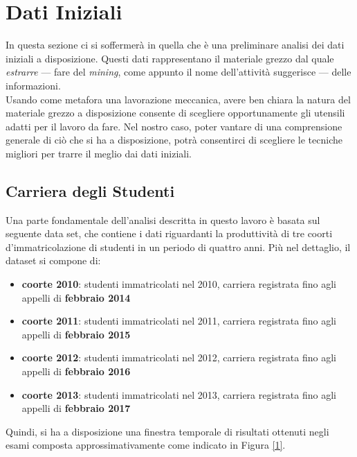 \chapter{Dati Iniziali}

In questa sezione ci si soffermerà in quella che è una preliminare analisi dei dati iniziali a disposizione. Questi dati rappresentano il materiale grezzo dal quale \textit{estrarre} --- fare del \textit{mining}, come appunto il nome dell'attività suggerisce --- delle informazioni. \\

Usando come metafora una lavorazione meccanica, avere ben chiara la natura del materiale grezzo a disposizione consente di scegliere opportunamente gli utensili adatti per il lavoro da fare. Nel nostro caso, poter vantare di una comprensione generale di ciò che si ha a disposizione, potrà consentirci di scegliere le tecniche migliori per trarre il meglio dai dati iniziali. \\

\section{Carriera degli Studenti}

Una parte fondamentale dell'analisi descritta in questo lavoro è basata sul seguente data set, che contiene i dati riguardanti la produttività di tre coorti d'immatricolazione di studenti in un periodo di quattro anni. Più nel dettaglio, il dataset si compone di:

\begin{itemize}
	\item \textbf{coorte 2010}: studenti immatricolati nel 2010, carriera registrata fino agli appelli di \textbf{febbraio 2014}
	\item \textbf{coorte 2011}: studenti immatricolati nel 2011, carriera registrata fino agli appelli di \textbf{febbraio 2015}
	\item \textbf{coorte 2012}: studenti immatricolati nel 2012, carriera registrata fino agli appelli di \textbf{febbraio 2016}
	\item \textbf{coorte 2013}: studenti immatricolati nel 2013, carriera registrata fino agli appelli di \textbf{febbraio 2017}
\end{itemize}

Quindi, si ha a disposizione una finestra temporale di risultati ottenuti negli esami composta approssimativamente come indicato in Figura \ref{1}. \\

